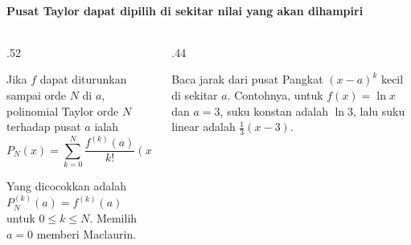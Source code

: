 \documentclass{../../kalkulus-ppt}
\begin{document}
\begin{frame}{\insertsection}
    \framesubtitle{Pusat Taylor dapat dipilih di sekitar nilai yang akan dihampiri}
    \begin{columns}[c,onlytextwidth]
        \begin{column}{.52\textwidth}
            \begin{definisi}
                Jika $f$ dapat diturunkan sampai orde $N$ di $a$,
                polinomial Taylor orde $N$ terhadap pusat $a$ ialah
                \[
                    P_N(x)=\sum_{k=0}^N
                        \frac{f^{(k)}(a)}{k!}(x-a)^k.
                \]
            \end{definisi}
            Yang dicocokkan adalah $P_N^{(k)}(a)=f^{(k)}(a)$
            untuk $0\le k\le N$. Memilih $a=0$ memberi Maclaurin.
        \end{column}
        \begin{column}{.44\textwidth}
            \begin{block}{Baca jarak dari pusat}
                Pangkat $(x-a)^k$ kecil di sekitar $a$.
                Contohnya, untuk $f(x)=\ln x$ dan $a=3$,
                suku konstan adalah $\ln 3$, lalu suku linear
                adalah $\tfrac13(x-3)$.
            \end{block}
        \end{column}
    \end{columns}
\end{frame}
\end{document}
